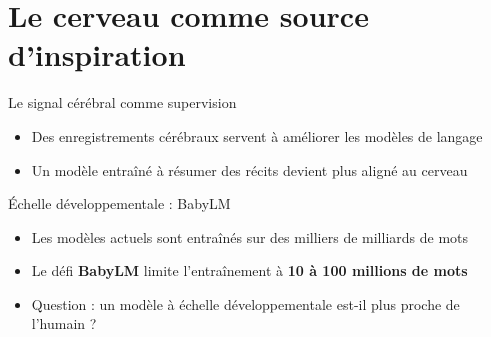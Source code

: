 \section{Le cerveau comme source d'inspiration}

\begin{frame}{Le signal cérébral comme supervision}
\begin{itemize}
    \item Des enregistrements cérébraux servent à améliorer les modèles de langage
    \item Un modèle entraîné à résumer des récits devient plus aligné au cerveau
\end{itemize}
\end{frame}

\begin{frame}{Échelle développementale : BabyLM}
\begin{itemize}
    \item Les modèles actuels sont entraînés sur des milliers de milliards de mots
    \item Le défi \textbf{BabyLM} limite l'entraînement à \textbf{10 à 100 millions de mots}
    \item Question : un modèle à échelle développementale est-il plus proche de l'humain ?
\end{itemize}
\end{frame}
